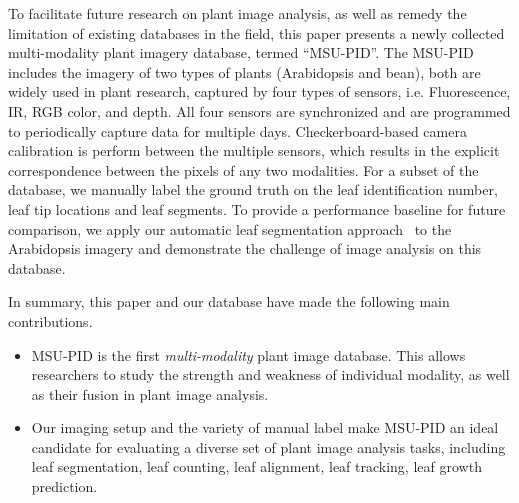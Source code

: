 To facilitate future research on plant image analysis, as well as remedy the limitation of existing databases in the field, this paper presents a newly collected multi-modality plant imagery database, termed ``MSU-PID''. The MSU-PID includes the imagery of two types of plants (Arabidopsis and bean), both are widely used in plant research, captured by four types of sensors, i.e. Fluorescence, IR, RGB color, and depth.
%
All four sensors are synchronized and are programmed to periodically capture data for multiple days. Checkerboard-based camera calibration is perform between the multiple sensors, which results in the explicit correspondence between the pixels of any two modalities. For a subset of the database, we manually label the ground truth on the leaf identification number, leaf tip locations and leaf segments. To provide a performance baseline for future comparison, we apply our automatic leaf segmentation approach~\cite{yin2014a,yin2014b} to the Arabidopsis imagery and demonstrate the challenge of image analysis on this database.

In summary, this paper and our database have made the following main contributions.
\begin{itemize}
\item MSU-PID is the first {\it multi-modality} plant image database. This allows researchers to study the strength and weakness of individual modality, as well as their fusion in plant image analysis.
\item Our imaging setup and the variety of manual label make MSU-PID an ideal candidate for evaluating a diverse set of plant image analysis tasks, including leaf segmentation, leaf counting, leaf alignment, leaf tracking, leaf growth prediction.
\end{itemize}




